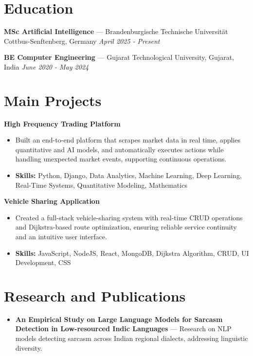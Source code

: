 \documentclass[a4paper,10pt]{article}
\begin{document}
\section*{Education}
\textbf{MSc Artificial Intelligence} — Brandenburgische Technische Universität Cottbus-Senftenberg, Germany \hfill \textit{April 2025 - Present}\par
\vspace{1.5pt}
\textbf{BE Computer Engineering} — Gujarat Technological University, Gujarat, India \hfill \textit{June 2020 - May 2024}\par

\section*{Main Projects}
\textbf{High Frequency Trading Platform}\par
\vspace{1pt}
\begin{itemize}
  \item Built an end-to-end platform that scrapes market data in real time, applies quantitative and AI models, and automatically executes actions while handling unexpected market events, supporting continuous operations.
  \item \textbf{Skills:} Python, Django, Data Analytics, Machine Learning, Deep Learning, Real-Time Systems, Quantitative Modeling, Mathematics
\end{itemize}
\vspace{3pt}
\textbf{Vehicle Sharing Application}\par
\vspace{1pt}
\begin{itemize}
  \item Created a full-stack vehicle-sharing system with real-time CRUD operations and Dijkstra-based route optimization, ensuring reliable service continuity and an intuitive user interface.
  \item \textbf{Skills:} JavaScript, NodeJS, React, MongoDB, Dijkstra Algorithm, CRUD, UI Development, CSS
\end{itemize}

\section*{Research and Publications}
\begin{itemize}
\item \textbf{An Empirical Study on Large Language Models for Sarcasm Detection in Low-resourced Indic Languages} — Research on NLP models detecting sarcasm across Indian regional dialects, addressing linguistic diversity.
\end{itemize}
\end{document}
